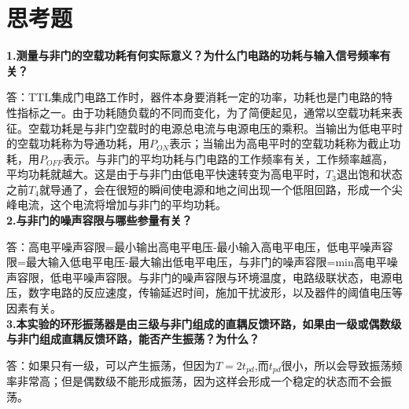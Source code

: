 \documentclass[a4 paper,12pt]{article}
\begin{document}
	\section{思考题}
	\noindent
	\textbf{1.测量与非门的空载功耗有何实际意义？为什么门电路的功耗与输入信号频率有关？
}
	\par 答：TTL集成门电路工作时，器件本身要消耗一定的功率，功耗也是门电路的特性指标之一。由于功耗随负载的不同而变化，为了简便起见，通常以空载功耗来表征。空载功耗是与非门空载时的电源总电流与电源电压的乘积。当输出为低电平时的空载功耗称为导通功耗，用$P_{ON}$表示；当输出为高电平时的空载功耗称为截止功耗，用$P_{OFF}$表示。与非门的平均功耗与门电路的工作频率有关，工作频率越高，平均功耗就越大。这是由于与非门由低电平快速转变为高电平时，$T_3$退出饱和状态之前$T_4$就导通了，会在很短的瞬间使电源和地之间出现一个低阻回路，形成一个尖峰电流，这个电流将增加与非门的平均功耗。\\
    \textbf{2.与非门的噪声容限与哪些参量有关？}
    \par 答：高电平噪声容限=最小输出高电平电压-最小输入高电平电压，低电平噪声容限=最大输入低电平电压-最大输出低电平电压，与非门的噪声容限=min{高电平噪声容限，低电平噪声容限}。与非门的噪声容限与环境温度，电路级联状态，电源电压，数字电路的反应速度，传输延迟时间，施加干扰波形，以及器件的阈值电压等因素有关。\\
    \textbf{3.本实验的环形振荡器是由三级与非门组成的直耦反馈环路，如果由一级或偶数级与非门组成直耦反馈环路，能否产生振荡？为什么？}
    \par 答：如果只有一级，可以产生振荡，但因为$T=2t_{pd}$,而$t_{pd}$很小，所以会导致振荡频率非常高；但是偶数级不能形成振荡，因为这样会形成一个稳定的状态而不会振荡。
\end{document}
